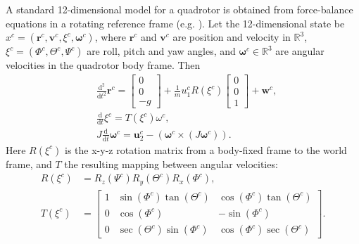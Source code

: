 \documentclass[conference]{IEEEtran}
\begin{document}
A standard 12-dimensional model for a quadrotor is obtained from force-balance equations in a rotating reference frame (e.g. \cite{Mellinger2011,Zhou2014}). Let the 12-dimensional state be $x^c = (\mathbf{r}^c, \mathbf{v}^c, \xi^c, \mathbf{\omega}^c)$, where $\mathbf{r}^c$ and $\mathbf{v}^c$ are position and velocity in $\mathbb{R}^3$, $\xi^c = (\Phi^c, \Theta^c, \Psi^c)$ are roll, pitch and yaw angles, and $\mathbf{\omega}^c \in \mathbb{R}^3$ are angular velocities in the quadrotor body frame. Then
\begin{equation}
\label{eq:quadrotor_dyn}
\begin{aligned}
  & \frac{\mathrm{d}^2}{\mathrm{d}t^2} \mathbf{r}^c = \begin{bmatrix}
    0 \\ 0 \\ -g
  \end{bmatrix} + \frac{1}{m} u^c_1 R(\xi^c) \begin{bmatrix}
    0 \\ 0 \\ 1
  \end{bmatrix} + \mathbf{w}^c, \\
  & \frac{\mathrm{d}}{\mathrm{d}t} \xi^c
   = T(\xi^c) \omega^c, \\
  & J \frac{\mathrm{d}}{\mathrm{d}t} \mathbf{\omega}^c = \mathbf{u}^c_2 - (\mathbf{\omega}^c \times (J \mathbf{\omega}^c)).
\end{aligned}
\end{equation}
Here $R(\xi^c)$ is the x-y-z rotation matrix from a body-fixed frame to the world frame, and $T$ the resulting mapping between angular velocities:
\begin{equation}
\begin{aligned}
  R(\xi^c) & = R_z(\Psi^c) R_y(\Theta^c) R_x(\Phi^c), \\
   T(\xi^c) & = \begin{bmatrix}
     1 & \sin(\Phi^c)\tan(\Theta^c) & \cos(\Phi^c)\tan(\Theta^c) \\
     0 & \cos(\Phi^c)   &  -\sin(\Phi^c) \\
     0 & \sec(\Theta^c)\sin(\Phi^c)  & \cos(\Phi^c)\sec(\Theta^c)
  \end{bmatrix}.
\end{aligned}
\end{equation}
\end{document}
